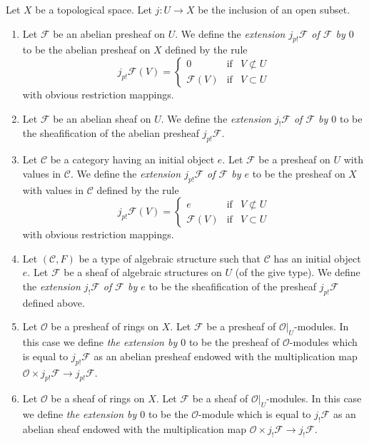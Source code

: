 \begin{definition}
\label{definition-j-shriek-structures}
Let $X$ be a topological space.
Let $j : U \to X$ be the inclusion of an open subset.
\begin{enumerate}
\item Let $\mathcal{F}$ be an abelian presheaf on $U$.
We define the {\it extension $j_{p!}\mathcal{F}$ of $\mathcal{F}$ by $0$}
to be the abelian presheaf on $X$ defined by the rule
$$
j_{p!}\mathcal{F}(V) =
\left\{
\begin{matrix}
0 & \text{if} & V \not \subset U \\
\mathcal{F}(V) & \text{if} & V \subset U
\end{matrix}
\right.
$$
with obvious restriction mappings.
\item Let $\mathcal{F}$ be an abelian sheaf on $U$. We define
the {\it extension $j_!\mathcal{F}$ of $\mathcal{F}$ by $0$}
to be the sheafification of the abelian presheaf $j_{p!}\mathcal{F}$.
\item Let $\mathcal{C}$ be a category having an initial object $e$.
Let $\mathcal{F}$ be a presheaf on $U$ with values in $\mathcal{C}$.
We define the {\it extension $j_{p!}\mathcal{F}$ of $\mathcal{F}$ by $e$}
to be the presheaf on $X$ with values in $\mathcal{C}$ defined by the
rule
$$
j_{p!}\mathcal{F}(V) =
\left\{
\begin{matrix}
e & \text{if} & V \not \subset U \\
\mathcal{F}(V) & \text{if} & V \subset U
\end{matrix}
\right.
$$
with obvious restriction mappings.
\item Let $(\mathcal{C}, F)$ be a type of algebraic structure
such that $\mathcal{C}$ has an initial object $e$.
Let $\mathcal{F}$ be a sheaf of algebraic structures on $U$
(of the give type). We define the
{\it extension $j_!\mathcal{F}$ of $\mathcal{F}$ by $e$}
to be the sheafification of the presheaf $j_{p!}\mathcal{F}$
defined above.
\item Let $\mathcal{O}$ be a presheaf of rings on $X$.
Let $\mathcal{F}$ be a presheaf of $\mathcal{O}|_U$-modules.
In this case we define {\it the extension by $0$}
to be the presheaf of $\mathcal{O}$-modules which is equal to
$j_{p!}\mathcal{F}$ as an abelian presheaf endowed with
the multiplication map
$\mathcal{O} \times j_{p!}\mathcal{F} \to j_{p!}\mathcal{F}$.
\item Let $\mathcal{O}$ be a sheaf of rings on $X$.
Let $\mathcal{F}$ be a sheaf of $\mathcal{O}|_U$-modules.
In this case we define {\it the extension by $0$}
to be the $\mathcal{O}$-module which is equal to
$j_!\mathcal{F}$ as an abelian sheaf endowed with
the multiplication map $\mathcal{O} \times j_!\mathcal{F} \to j_!\mathcal{F}$.
\end{enumerate}
\end{definition}

